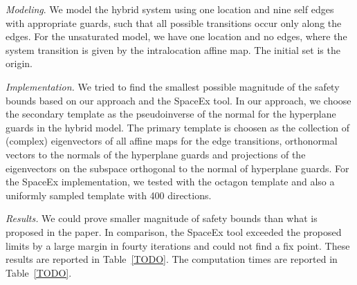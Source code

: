 \emph{Modeling}.  We model the hybrid system using one location and
nine self edges with appropriate guards, such that all possible
transitions occur only along the edges.  For the unsaturated model, we
have one location and no edges, where the system transition is given
by the intralocation affine map.  The initial set is the origin.

\emph{Implementation.}  We tried to find the smallest possible
magnitude of the safety bounds based on our approach and the SpaceEx
tool.  In our approach, we choose the secondary template as the
pseudoinverse of the normal for the hyperplane guards in the hybrid
model.  The primary template is choosen as the collection of (complex)
eigenvectors of all affine maps for the edge transitions, orthonormal
vectors to the normals of the hyperplane guards and projections of the
eigenvectors on the subspace orthogonal to the normal of hyperplane
guards.  For the SpaceEx implementation, we tested with the octagon
template and also a uniformly sampled template with 400 directions.

\emph{Results.}  We could prove smaller magnitude of safety bounds
than what is proposed in the paper.  In comparison, the SpaceEx tool
exceeded the proposed limits by a large margin in fourty iterations
and could not find a fix point.  These results are reported in
Table~\ref{TODO}.  The computation times are reported in
Table~\ref{TODO}.

